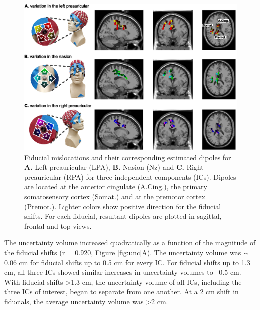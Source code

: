 \documentclass[../thesis_seyed.tex]{subfiles}
\begin{document}
\begin{figure}[t!]
      \centering
      \includegraphics[width=\linewidth]{../img/fig1.eps}
      \caption{Fiducial mislocations and their corresponding estimated dipoles for \textbf{A.} Left preauricular (LPA), \textbf{B.} Nasion (Nz) and \textbf{C.} Right preauricular (RPA) for three independent components (ICs). Dipoles are located at the anterior cingulate (A.Cing.), the primary somatosensory cortex (Somat.) and at the premotor cortex (Premot.). Lighter colors show positive direction for the fiducial shifts. For each fiducial, resultant dipoles are plotted in sagittal, frontal and top views.}
      \label{fig:sl}
\end{figure}

The uncertainty volume increased quadratically as a function of the magnitude of the fiducial shifts (r = 0.920, Figure \ref{fig:unc}A). The uncertainty volume was $\thicksim$0.06 cm for fiducial shifts up to 0.5 cm for every IC. For fiducial shifts up to 1.3 cm, all three ICs showed similar increases in uncertainty volumes to ~0.5 cm. With fiducial shifts >1.3 cm, the uncertainty volume of all ICs, including the three ICs of interest, began to separate from one another. At a 2 cm shift in fiducials, the average uncertainty volume was >2 cm.
\end{document}
